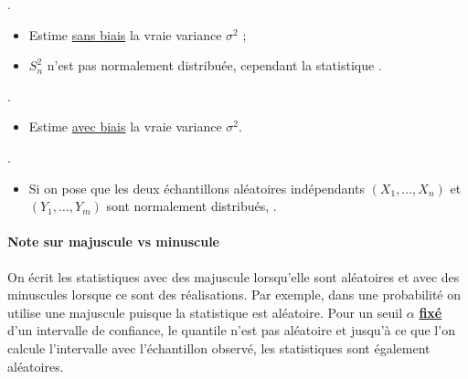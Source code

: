 \documentclass[10pt, french]{article}
\begin{document}
\begin{multicols*}{2}
\begin{definitionNOHFILLprop}
.

\begin{itemize}
	\item	Estime \underline{sans biais} la vraie variance $\sigma^{2}$ ;
	\item	$S^{2}_{n}$ n'est pas normalement distribuée, cependant la statistique .
\end{itemize}
\end{definitionNOHFILLprop}

\begin{definitionNOHFILLprop}
.

\begin{itemize}
	\item	Estime \underline{avec biais} la vraie variance $\sigma^{2}$.
\end{itemize}
\end{definitionNOHFILLprop}

\begin{definitionNOHFILLprop}[Statistique $F$]
.

\begin{itemize}
	\item	Si on pose que les deux échantillons aléatoires indépendants $(X_{1}, \dots, X_{n})$ et $(Y_{1}, \dots, Y_{m})$ sont normalement distribués, .
\end{itemize}
\end{definitionNOHFILLprop}

\paragraph{Note sur majuscule vs minuscule}	On écrit les statistiques avec des majuscule lorsqu'elle sont aléatoires et avec des minuscules lorsque ce sont des réalisations. Par exemple, dans une probabilité on utilise une majuscule puisque la statistique est aléatoire. 
Pour un seuil $\alpha$ \textbf{\underline{fixé}} d'un intervalle de confiance, le quantile n'est pas aléatoire et jusqu'à ce que l'on calcule l'intervalle avec l'échantillon observé, les statistiques sont également aléatoires. 


\end{multicols*}
\end{document}
